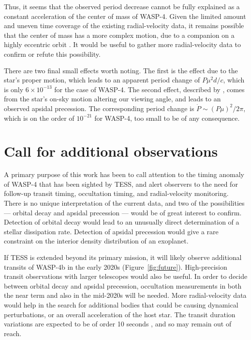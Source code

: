 \documentclass[12pt,twocolumn,tighten]{aastex62}
\begin{document}
Thus, it seems that the observed period decrease cannot be fully
explained as a constant acceleration of the center of mass of WASP-4.
Given the limited amount and uneven time coverage of the existing
radial-velocity data, it remains possible that the center of mass has
a more complex motion, due to a companion on a highly eccentric orbit
\citep[similar to {\it e.g.}, WASP-53 or WASP-81][]{triaud_peculiar_2017}.
It would be useful to gather more radial-velocity data to confirm or
refute this possibility.

There are two final small effects worth noting.  The first is the
\citet{shklovskii_possible_1970} effect due to the star's proper
motion, which leads to an apparent period change of $P\mu^2 d/ c$,
which is only $6\times10^{-13}$ for the case of WASP-4.  The second
effect, described by \citet{rafikov_stellar_2009}, comes from the
star's on-sky motion altering our viewing angle, and leads to an
observed apsidal precession. The corresponding period change is
$\dot{P} \sim (P\mu)^2/2\pi$, which is on the order of $10^{-21}$ for
WASP-4, too small to be of any consequence.


\section{Call for additional observations}
\label{sec:future}

A primary purpose of this work has been to call attention to the
timing anomaly of WASP-4 that has been sighted by TESS, and alert
observers to the need for follow-up transit timing, occultation
timing, and radial-velocity monitoring.  There is no unique
interpretation of the current data, and two of the possibilities ---
orbital decay and apsidal precession --- would be of great interest to
confirm. Detection of orbital decay would lead to an unusually direct
determination of a stellar dissipation rate. Detection of apsidal
precession would give a rare constraint on the interior density
distribution of an exoplanet.

If TESS is extended beyond its primary mission, it will likely observe
additional transits of WASP-4b in the early 2020s
(Figure~\ref{fig:future}).  High-precision transit observations with
larger telescopes would also be useful. 
In order to decide between orbital decay and
apsidal precession, occultation measurements in both the near term and
also in the mid-2020s will be needed.  More radial-velocity data would
help in the search for additional bodies that could be causing
dynamical perturbations, or an overall acceleration of the host star.  
The transit duration variations are expected to be of order 10 seconds
\citep{pal_periastron_2008}, and so may remain out of reach.
\end{document}

